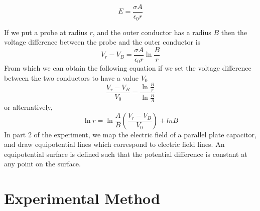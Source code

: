 \documentclass[letterpaper]{article}
\begin{document}
\begin{equation}
  E=\frac{\sigma A}{\epsilon_0 r}
\end{equation}

If we put a probe at radius $r$, and the outer conductor has a radius $B$ then the voltage
difference between the probe and the outer conductor is
\begin{equation}
  V_r-V_B=\frac{\sigma A}{\epsilon_0 r} \ln{\frac{B}{r}}
\end{equation}
From which we can obtain the following equation if we set the voltage difference between the two conductors to have a value $V_0$
\begin{equation}
  \frac{V_r-V_B}{V_0}=\frac{\ln{\frac{B}{r}}}{\ln{\frac{B}{A}}}
\end{equation}
or alternatively,
\begin{equation}
  \ln{r} =\ln{\frac{A}{B}}(\frac{V_r-V_B}{V_0}) + ln{B}
\end{equation}
In part 2 of the experiment, we map the electric field of a parallel plate capacitor, and draw equipotential lines
which correspond to electric field lines. An equipotential surface is defined such that the
potential difference is constant at any point on the surface.


\section{Experimental Method}
\end{document}
